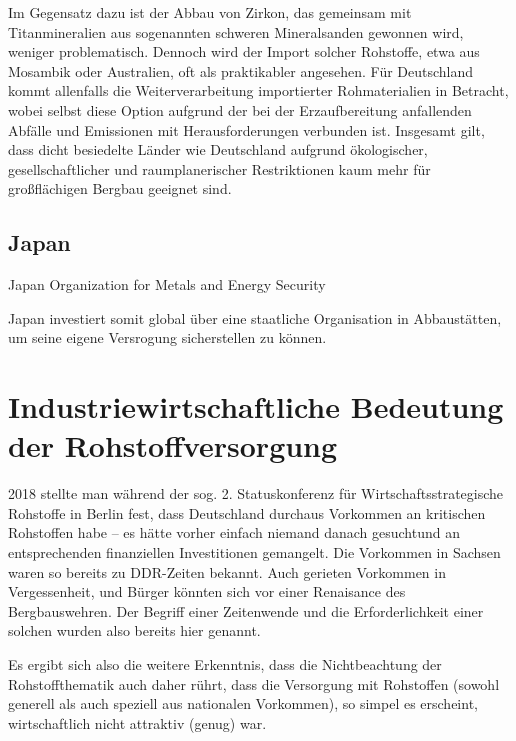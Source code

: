 \documentclass[12pt,a4paper,oneside]{book} %
\begin{document}
Im Gegensatz dazu ist der Abbau von Zirkon, das gemeinsam mit Titanmineralien aus sogenannten schweren Mineralsanden gewonnen wird, weniger problematisch. Dennoch wird der Import solcher Rohstoffe, etwa aus Mosambik oder Australien, oft als praktikabler angesehen. Für Deutschland kommt allenfalls die Weiterverarbeitung importierter Rohmaterialien in Betracht, wobei selbst diese Option aufgrund der bei der Erzaufbereitung anfallenden Abfälle und Emissionen mit Herausforderungen verbunden ist. Insgesamt gilt, dass dicht besiedelte Länder wie Deutschland aufgrund ökologischer, gesellschaftlicher und raumplanerischer Restriktionen kaum mehr für großflächigen Bergbau geeignet sind.



\subsection{Japan}

Japan Organization for Metals and Energy Security

Japan investiert somit global über eine staatliche Organisation in Abbaustätten, um seine eigene Versrogung sicherstellen zu können.



\section{Industriewirtschaftliche Bedeutung der Rohstoffversorgung}


2018 stellte man während der sog. 2. Statuskonferenz für Wirtschaftsstrategische Rohstoffe in Berlin fest, dass Deutschland durchaus Vorkommen an kritischen Rohstoffen habe -- es hätte vorher \glqq einfach niemand danach gesucht\grqq und an entsprechenden finanziellen Investitionen gemangelt.\autocite{VDINachrichten: Rohstoffe: Deutschland ist reich an seltenen Erden} Die Vorkommen in Sachsen waren so bereits zu DDR-Zeiten bekannt. Auch gerieten Vorkommen in Vergessenheit, und Bürger könnten sich vor einer \glqq Renaisance des Bergbaus\grqq wehren. Der Begriff einer Zeitenwende und die Erforderlichkeit einer solchen wurden also bereits hier genannt.





Es ergibt sich also die weitere Erkenntnis, dass die Nichtbeachtung der Rohstoffthematik auch daher rührt, dass die Versorgung mit Rohstoffen (sowohl generell als auch speziell aus nationalen Vorkommen), so simpel es erscheint, wirtschaftlich nicht attraktiv (genug) war.
\end{document}
